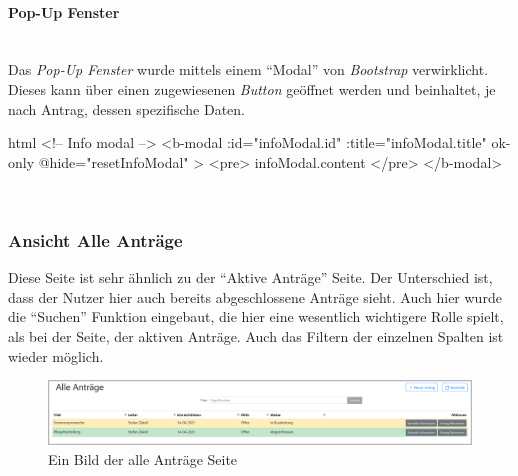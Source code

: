 \paragraph{Pop-Up Fenster}
~\\
Das \textit{Pop-Up Fenster} wurde mittels einem \enquote{Modal} von \textit{Bootstrap} verwirklicht. Dieses kann über einen zugewiesenen \textit{Button} geöffnet werden und beinhaltet, je nach Antrag, dessen spezifische Daten.
\begin{code}{html}
	<!-- Info modal -->
    <b-modal
      :id="infoModal.id"
      :title="infoModal.title"
      ok-only
      @hide="resetInfoModal"
    >
      <pre>{{ infoModal.content }}</pre>
    </b-modal>
\end{code}
	\label{list:codepopup} ~\\

\subsubsection{Ansicht Alle Anträge}
\label{chapter:implementierung-frontend-komponenten-alle}
Diese Seite ist sehr ähnlich zu der \enquote{Aktive Anträge} Seite. Der Unterschied ist, dass der Nutzer hier auch bereits abgeschlossene Anträge sieht. Auch hier wurde die \enquote{Suchen} Funktion eingebaut, die hier eine wesentlich wichtigere Rolle spielt, als bei der Seite, der aktiven Anträge. Auch das Filtern der einzelnen Spalten ist wieder möglich.
\begin{figure}[H]
	\centering
	\includegraphics[width=1\linewidth]{images/website/alle}
	\caption[Alle Anträge Seite]{Ein Bild der alle Anträge Seite}
	\label{fig:antragalle}
\end{figure}
~\\

\newpage
